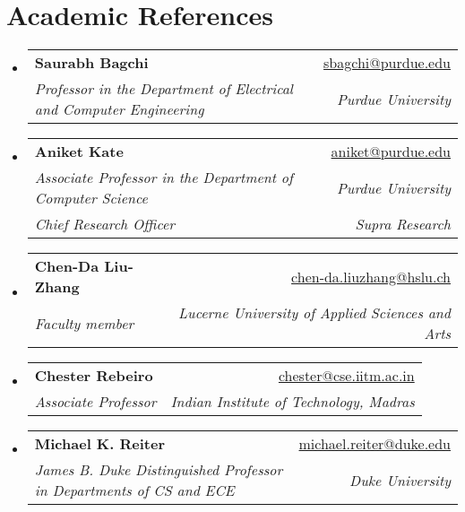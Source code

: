 \documentclass[letterpaper,11pt]{article}
\makeatletter
\newcommand{\resumeSubheading}[4]{
  \vspace{-2pt}\item
    \begin{tabular*}{0.97\textwidth}[t]{l@{\extracolsep{\fill}}r}
      \textbf{#1} & #2 \\
      \textit{\small#3} & \textit{\small #4} \\
    \end{tabular*}\vspace{-7pt}
}
\newcommand{\resumeEducationHeading}[6]{
  \vspace{-2pt}\item
    \begin{tabular*}{0.97\textwidth}[t]{l@{\extracolsep{\fill}}r}
      \textbf{#1} & #2 \\
      \textit{\small#3} & \textit{\small #4} \\
      \textit{\small#5} & \textit{\small #6} \\
    \end{tabular*}\vspace{-5pt}
}
\newcommand{\resumeSubHeadingListStart}{\begin{itemize}[leftmargin=0.15in, label={}]}
\newcommand{\resumeSubHeadingListEnd}{\end{itemize}}
\makeatother
\begin{document}
\section{Academic References}
\resumeSubHeadingListStart
\resumeSubheading{Saurabh Bagchi}{\href{mailto:sbagchi@purdue.edu}{sbagchi@purdue.edu}}{Professor in the Department of Electrical and Computer Engineering}{Purdue University}
\resumeEducationHeading{Aniket Kate}{\href{mailto:aniket@purdue.edu}{aniket@purdue.edu}}
{Associate Professor in the Department of Computer Science}{Purdue University}{Chief Research Officer}{Supra Research}
\resumeSubheading{Chen-Da Liu-Zhang}{\href{mailto:chen-da.liuzhang@hslu.ch}{chen-da.liuzhang@hslu.ch}}{Faculty member}{Lucerne University of Applied Sciences and Arts}
\resumeSubheading{Chester Rebeiro}{\href{mailto:chester@cse.iitm.ac.in}{chester@cse.iitm.ac.in}}{Associate Professor}{Indian Institute of Technology, Madras}
\resumeSubheading{Michael K. Reiter}{\href{mailto:michael.reiter@duke.edu}{michael.reiter@duke.edu}}{James B. Duke Distinguished Professor in Departments of CS and ECE}{Duke University}
\resumeSubHeadingListEnd

        




    
\end{document}
